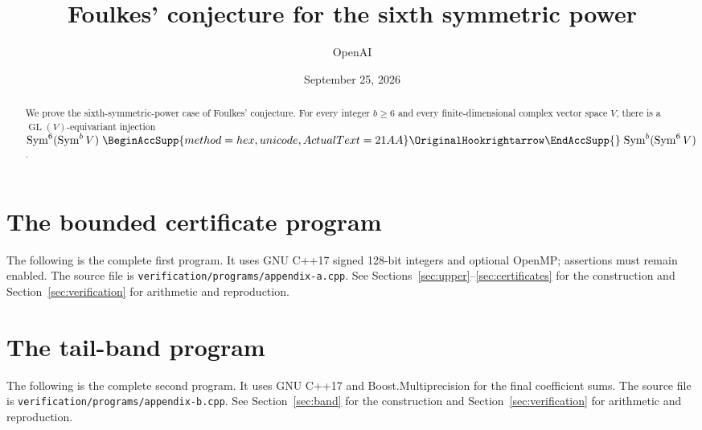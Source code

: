 \documentclass[11pt]{article}
\title{Foulkes' conjecture for the sixth symmetric power}
\author{OpenAI}
\date{September 25, 2026}
\renewcommand{\hookrightarrow}{\mathrel{%
  \BeginAccSupp{method=hex,unicode,ActualText=21AA}%
  \OriginalHookrightarrow\EndAccSupp{}}}
\theoremstyle{definition}
\theoremstyle{remark}
\DeclareMathOperator{\Sym}{Sym}
\DeclareMathOperator{\GL}{GL}
\begin{document}
\maketitle
\begin{abstract}
We prove the sixth-symmetric-power case of Foulkes' conjecture. For every
integer \(b\ge6\) and every finite-dimensional complex vector space \(V\),
there is a \(\GL(V)\)-equivariant injection
\(\Sym^6(\Sym^b V)\hookrightarrow\Sym^b(\Sym^6 V)\).
\end{abstract}









\appendix
\section{The bounded certificate program}\label{app:certificate}
The following is the complete first program. It uses GNU C++17 signed
128-bit integers and optional OpenMP; assertions must remain enabled.
The source file is \nolinkurl{verification/programs/appendix-a.cpp}.
See Sections~\ref{sec:upper}--\ref{sec:certificates} for the construction
and Section~\ref{sec:verification} for arithmetic and reproduction.

\section{The tail-band program}\label{app:band}
The following is the complete second program. It uses GNU C++17 and
Boost.Multiprecision for the final coefficient sums.
The source file is \texttt{verification/programs/appendix-b.cpp}.
See Section~\ref{sec:band} for the construction and
Section~\ref{sec:verification} for arithmetic and reproduction.

\end{document}

